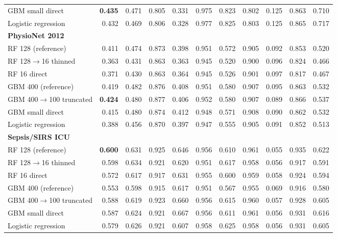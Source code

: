 {\begin{longtable}{lrrrrrrrrrr}
\quad GBM small direct & \textbf{0.435} & 0.471 & 0.805 & 0.331 & 0.975 & 0.823 & 0.802 & 0.125 & 0.863 & 0.710 \\
\quad Logistic regression & 0.432 & 0.469 & 0.806 & 0.328 & 0.977 & 0.825 & 0.803 & 0.125 & 0.865 & 0.717 \\
\midrule
\multicolumn{11}{l}{\textbf{PhysioNet 2012}} \\*
\quad RF 128 (reference) & 0.411 & 0.474 & 0.873 & 0.398 & 0.951 & 0.572 & 0.905 & 0.092 & 0.853 & 0.520 \\
\quad RF 128$\rightarrow$16 thinned & 0.363 & 0.431 & 0.863 & 0.363 & 0.945 & 0.520 & 0.900 & 0.096 & 0.824 & 0.466 \\
\quad RF 16 direct & 0.371 & 0.430 & 0.863 & 0.364 & 0.945 & 0.526 & 0.901 & 0.097 & 0.817 & 0.467 \\
\quad GBM 400 (reference) & 0.419 & 0.482 & 0.876 & 0.408 & 0.951 & 0.580 & 0.907 & 0.095 & 0.863 & 0.532 \\
\quad GBM 400$\rightarrow$100 truncated & \textbf{0.424} & 0.480 & 0.877 & 0.406 & 0.952 & 0.580 & 0.907 & 0.089 & 0.866 & 0.537 \\
\quad GBM small direct & 0.415 & 0.480 & 0.874 & 0.412 & 0.948 & 0.571 & 0.908 & 0.090 & 0.862 & 0.532 \\
\quad Logistic regression & 0.388 & 0.456 & 0.870 & 0.397 & 0.947 & 0.555 & 0.905 & 0.091 & 0.852 & 0.513 \\
\midrule
\multicolumn{11}{l}{\textbf{Sepsis/SIRS ICU}} \\*
\quad RF 128 (reference) & \textbf{0.600} & 0.631 & 0.925 & 0.646 & 0.956 & 0.610 & 0.961 & 0.055 & 0.935 & 0.622 \\
\quad RF 128$\rightarrow$16 thinned & 0.598 & 0.634 & 0.921 & 0.620 & 0.951 & 0.617 & 0.958 & 0.056 & 0.917 & 0.591 \\
\quad RF 16 direct & 0.572 & 0.617 & 0.917 & 0.631 & 0.955 & 0.600 & 0.959 & 0.058 & 0.924 & 0.594 \\
\quad GBM 400 (reference) & 0.553 & 0.598 & 0.915 & 0.617 & 0.951 & 0.567 & 0.955 & 0.069 & 0.916 & 0.580 \\
\quad GBM 400$\rightarrow$100 truncated & 0.588 & 0.619 & 0.923 & 0.660 & 0.956 & 0.615 & 0.960 & 0.057 & 0.928 & 0.605 \\
\quad GBM small direct & 0.587 & 0.624 & 0.921 & 0.667 & 0.956 & 0.611 & 0.961 & 0.056 & 0.931 & 0.616 \\
\quad Logistic regression & 0.579 & 0.626 & 0.921 & 0.607 & 0.958 & 0.625 & 0.958 & 0.056 & 0.931 & 0.605 \\

\end{longtable}}
